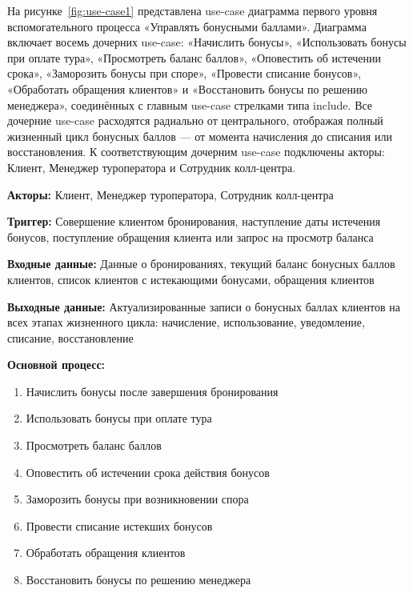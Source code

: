 \documentclass[11pt,a4paper,final]{article}
\begin{document}
На рисунке~\ref{fig:use-case1} представлена use-case диаграмма первого уровня вспомогательного процесса «Управлять бонусными баллами». Диаграмма включает восемь дочерних use-case: «Начислить бонусы», «Использовать бонусы при оплате тура», «Просмотреть баланс баллов», «Оповестить об истечении срока», «Заморозить бонусы при споре», «Провести списание бонусов», «Обработать обращения клиентов» и «Восстановить бонусы по решению менеджера», соединённых с главным use-case стрелками типа include. Все дочерние use-case расходятся радиально от центрального, отображая полный жизненный цикл бонусных баллов — от момента начисления до списания или восстановления. К соответствующим дочерним use-case подключены акторы: Клиент, Менеджер туроператора и Сотрудник колл-центра.

\textbf{Акторы:} Клиент, Менеджер туроператора, Сотрудник колл-центра

\textbf{Триггер:} Совершение клиентом бронирования, наступление даты истечения бонусов, поступление обращения клиента или запрос на просмотр баланса

\textbf{Входные данные:} Данные о бронированиях, текущий баланс бонусных баллов клиентов, список клиентов с истекающими бонусами, обращения клиентов

\textbf{Выходные данные:} Актуализированные записи о бонусных баллах клиентов на всех этапах жизненного цикла: начисление, использование, уведомление, списание, восстановление

\textbf{Основной процесс:}
\begin{enumerate}
	\item Начислить бонусы после завершения бронирования
	\item Использовать бонусы при оплате тура
	\item Просмотреть баланс баллов
	\item Оповестить об истечении срока действия бонусов
	\item Заморозить бонусы при возникновении спора
	\item Провести списание истекших бонусов
	\item Обработать обращения клиентов
	\item Восстановить бонусы по решению менеджера
\end{enumerate}
\end{document}
